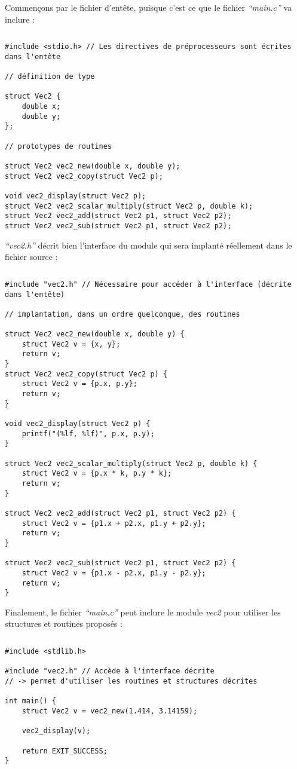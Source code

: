 \documentclass[../../../main.tex]{subfiles}
\begin{document}
Commençons par le fichier d'entête, puisque c'est ce que le fichier \textit{``main.c''} va inclure :
\begin{lstlisting}[title=vec2.h]
\end{lstlisting}
\begin{verbatim}
#include <stdio.h> // Les directives de préprocesseurs sont écrites dans l'entête

// définition de type

struct Vec2 {
	double x;
	double y;
};

// prototypes de routines

struct Vec2 vec2_new(double x, double y);
struct Vec2 vec2_copy(struct Vec2 p);

void vec2_display(struct Vec2 p);
struct Vec2 vec2_scalar_multiply(struct Vec2 p, double k);
struct Vec2 vec2_add(struct Vec2 p1, struct Vec2 p2);
struct Vec2 vec2_sub(struct Vec2 p1, struct Vec2 p2);
\end{verbatim}
\textit{``vec2.h''} décrit bien l'interface du module qui sera implanté réellement dans le fichier source :
\begin{lstlisting}[title=vec2.c]
\end{lstlisting}
\begin{verbatim}
#include "vec2.h" // Nécessaire pour accéder à l'interface (décrite dans l'entête)

// implantation, dans un ordre quelconque, des routines

struct Vec2 vec2_new(double x, double y) {
	struct Vec2 v = {x, y};
	return v;
}
struct Vec2 vec2_copy(struct Vec2 p) {
	struct Vec2 v = {p.x, p.y};
	return v;
}

void vec2_display(struct Vec2 p) {
	printf("(%lf, %lf)", p.x, p.y);
}

struct Vec2 vec2_scalar_multiply(struct Vec2 p, double k) {
	struct Vec2 v = {p.x * k, p.y * k};
	return v;
}

struct Vec2 vec2_add(struct Vec2 p1, struct Vec2 p2) {
	struct Vec2 v = {p1.x + p2.x, p1.y + p2.y};
	return v;
}

struct Vec2 vec2_sub(struct Vec2 p1, struct Vec2 p2) {
	struct Vec2 v = {p1.x - p2.x, p1.y - p2.y};
	return v;
}
\end{verbatim}
Finalement, le fichier \textit{``main.c''} peut inclure le module \textit{vec2} pour utiliser les structures et routines proposés :
\begin{lstlisting}[title=main.c]
\end{lstlisting}
\begin{verbatim}
#include <stdlib.h>

#include "vec2.h" // Accède à l'interface décrite
// -> permet d'utiliser les routines et structures décrites

int main() {
	struct Vec2 v = vec2_new(1.414, 3.14159);

	vec2_display(v);

	return EXIT_SUCCESS;
}
\end{verbatim}
\end{document}
